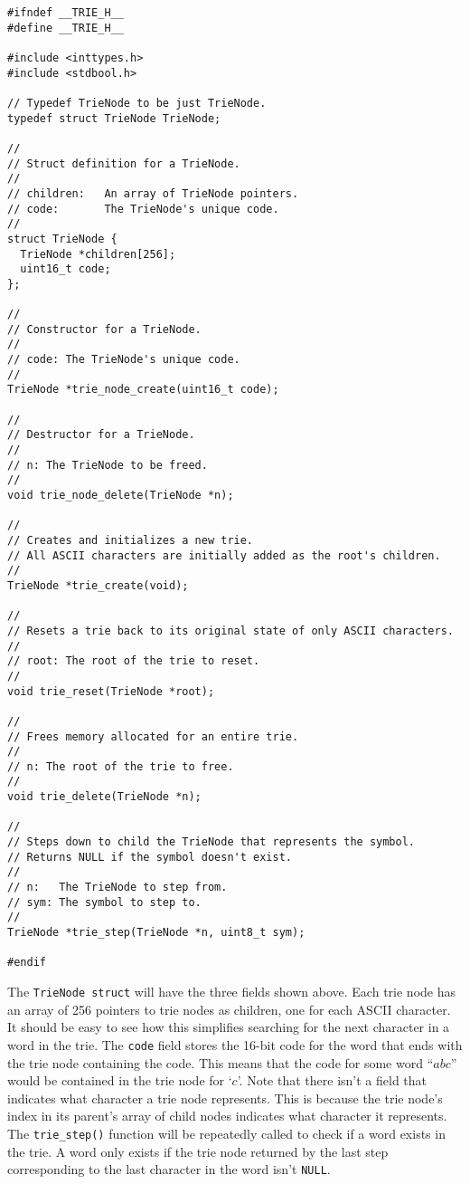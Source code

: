 \documentclass{article}
\begin{document}
\begin{lstlisting}[title=trie.h]
#ifndef __TRIE_H__
#define __TRIE_H__

#include <inttypes.h>
#include <stdbool.h>

// Typedef TrieNode to be just TrieNode.
typedef struct TrieNode TrieNode;

//
// Struct definition for a TrieNode.
//
// children:   An array of TrieNode pointers.
// code:       The TrieNode's unique code.
//
struct TrieNode {
  TrieNode *children[256];
  uint16_t code;
};

//
// Constructor for a TrieNode.
//
// code: The TrieNode's unique code.
//
TrieNode *trie_node_create(uint16_t code);

//
// Destructor for a TrieNode.
//
// n: The TrieNode to be freed.
//
void trie_node_delete(TrieNode *n);

//
// Creates and initializes a new trie.
// All ASCII characters are initially added as the root's children.
//
TrieNode *trie_create(void);

//
// Resets a trie back to its original state of only ASCII characters.
//
// root: The root of the trie to reset.
//
void trie_reset(TrieNode *root);

//
// Frees memory allocated for an entire trie.
//
// n: The root of the trie to free.
//
void trie_delete(TrieNode *n);

//
// Steps down to child the TrieNode that represents the symbol.
// Returns NULL if the symbol doesn't exist.
//
// n:   The TrieNode to step from.
// sym: The symbol to step to.
//
TrieNode *trie_step(TrieNode *n, uint8_t sym);

#endif
\end{lstlisting}

The \texttt{TrieNode struct} will have the three fields shown above. Each trie
node has an
array of 256 pointers to trie nodes as children, one for each ASCII character. It should be
easy to see how this simplifies searching for the next character in a word in
the trie. The \texttt{code} field stores the 16-bit code for the word that ends
with the trie node containing the code. This means that the code for
some word ``$abc$'' would be contained in the trie node for `$c$'. Note that
there isn't a field that indicates what character a trie node represents. This is
because the trie node's index in its parent's array of child nodes indicates what
character it represents. The \texttt{trie\_step()} function
will be repeatedly called to check if a word exists in the trie. A word only
exists if the trie node returned by the last step corresponding to the last
character in the word isn't \texttt{NULL}.
\end{document}
